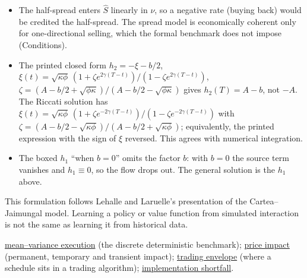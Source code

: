 \begin{qfmodel}
\begin{itemize}
\item The half-spread enters $\hat S$ linearly in $\nu$, so a negative rate (buying back) would be credited the half-spread. The spread model is economically coherent only for one-directional selling, which the formal benchmark does not impose (Conditions).
\item The printed closed form $h_2=-\xi-b/2$, $\xi(t)=\sqrt{\kappa\phi}\,(1+\zeta e^{2\gamma(T-t)})/(1-\zeta e^{2\gamma(T-t)})$, $\zeta=(A-b/2+\sqrt{\phi\kappa})/(A-b/2-\sqrt{\phi\kappa})$ gives $h_2(T)=A-b$, not $-A$. The Riccati solution has $\xi(t)=\sqrt{\kappa\phi}\,(1+\zeta e^{-2\gamma(T-t)})/(1-\zeta e^{-2\gamma(T-t)})$ with $\zeta=(A-b/2-\sqrt{\kappa\phi})/(A-b/2+\sqrt{\kappa\phi})$; equivalently, the printed expression with the sign of $\xi$ reversed. This agrees with numerical integration.
\item The boxed $h_1$ ``when $b=0$'' omits the factor $b$: with $b=0$ the source term vanishes and $h_1\equiv0$, so the flow drops out. The general solution is the $h_1$ above.
\end{itemize}
This formulation follows Lehalle and Laruelle's presentation of the Cartea--Jaimungal model. Learning a policy or value function from simulated interaction is not the same as learning it from historical data.

 \hyperref[mod:almgren-chriss-execution]{mean--variance execution} (the discrete deterministic benchmark); \hyperref[def:price-impact]{price impact} (permanent, temporary and transient impact); \hyperref[def:trading-envelope]{trading envelope} (where a schedule sits in a trading algorithm); \hyperref[def:implementation-shortfall]{implementation shortfall}.

\end{qfmodel}
